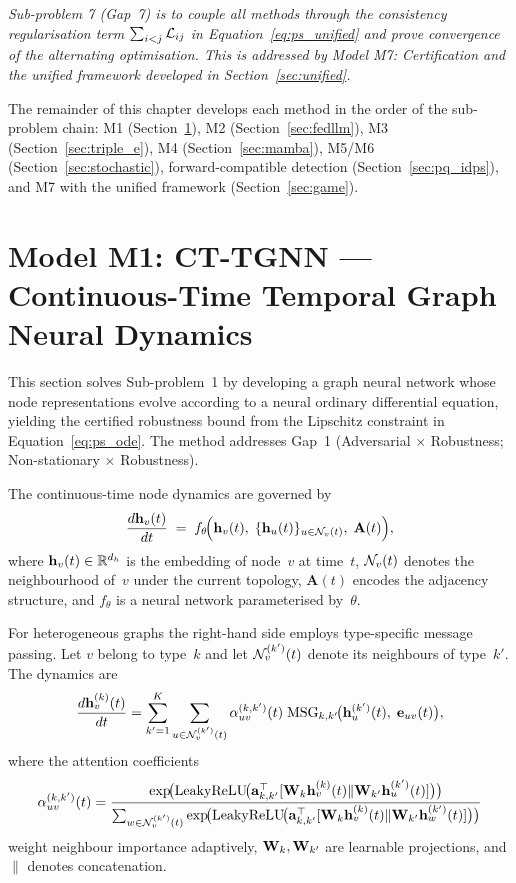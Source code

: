 \emph{Sub-problem 7 (Gap~7) is to couple all methods through the consistency regularisation term $\sum_{i<j}\mathcal{L}_{ij}$ in Equation~\eqref{eq:ps_unified} and prove convergence of the alternating optimisation. This is addressed by Model M7: Certification and the unified framework developed in Section~\ref{sec:unified}.}

The remainder of this chapter develops each method in the order of the sub-problem chain: M1 (Section~\ref{sec:ct_tgnn}), M2 (Section~\ref{sec:fedllm}), M3 (Section~\ref{sec:triple_e}), M4 (Section~\ref{sec:mamba}), M5/M6 (Section~\ref{sec:stochastic}), forward-compatible detection (Section~\ref{sec:pq_idps}), and M7 with the unified framework (Section~\ref{sec:game}).

\section{Model M1: CT-TGNN --- Continuous-Time Temporal Graph Neural Dynamics}
\label{sec:ct_tgnn}

This section solves Sub-problem~1 by developing a graph neural network whose node representations evolve according to a neural ordinary differential equation, yielding the certified robustness bound from the Lipschitz constraint in Equation~\eqref{eq:ps_ode}. The method addresses Gap~1 (Adversarial $\times$ Robustness; Non-stationary $\times$ Robustness).

The continuous-time node dynamics are governed by\begin{equation}
\frac{d\mathbf{h}_v(t)}{dt}
\;=\; f_\theta\!\Bigl(\mathbf{h}_v(t),\;\{\mathbf{h}_u(t)\}_{u\in\mathcal{N}_v(t)},\;\mathbf{A}(t)\Bigr),
\label{eq:ct_tgnn_homo}
\end{equation}
where $\mathbf{h}_v(t)\in\mathbb{R}^{d_h}$ is the embedding of node~$v$ at time~$t$, $\mathcal{N}_v(t)$ denotes the neighbourhood of~$v$ under the current topology, $\mathbf{A}(t)$ encodes the adjacency structure, and $f_\theta$ is a neural network parameterised by~$\theta$.

For heterogeneous graphs the right-hand side employs type-specific message passing. Let $v$ belong to type~$k$ and let $\mathcal{N}_v^{(k')}(t)$ denote its neighbours of type~$k'$. The dynamics are
\begin{equation}
\frac{d\mathbf{h}_v^{(k)}(t)}{dt}
= \sum_{k'=1}^{K}\sum_{u\in\mathcal{N}_v^{(k')}(t)}
  \alpha_{uv}^{(k,k')}(t)\;\mathrm{MSG}_{k,k'}\!\bigl(
    \mathbf{h}_u^{(k')}(t),\;\mathbf{e}_{uv}(t)\bigr),
\label{eq:ct_tgnn_hetero}
\end{equation}
where the attention coefficients~\cite{Velickovic2018}
\begin{equation}
\alpha_{uv}^{(k,k')}(t)
= \frac{
  \exp\!\bigl(\mathrm{LeakyReLU}\!\bigl(
    \mathbf{a}_{k,k'}^\top
    [\mathbf{W}_k\mathbf{h}_v^{(k)}(t)\|\mathbf{W}_{k'}\mathbf{h}_u^{(k')}(t)]
  \bigr)\bigr)
}{
  \sum_{w\in\mathcal{N}_v^{(k')}(t)}
  \exp\!\bigl(\mathrm{LeakyReLU}\!\bigl(
    \mathbf{a}_{k,k'}^\top
    [\mathbf{W}_k\mathbf{h}_v^{(k)}(t)\|\mathbf{W}_{k'}\mathbf{h}_w^{(k')}(t)]
  \bigr)\bigr)
}
\label{eq:ct_tgnn_attn}
\end{equation}
weight neighbour importance adaptively, $\mathbf{W}_k,\mathbf{W}_{k'}$ are learnable projections, and $\|$ denotes concatenation.

